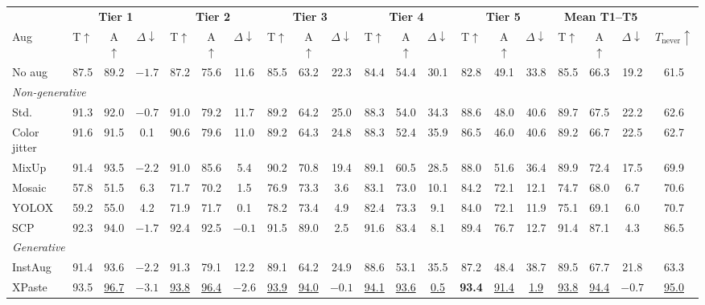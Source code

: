 \begin{tabular}{l ccc ccc ccc ccc ccc ccc c}
\toprule
& \multicolumn{3}{c}{\textbf{Tier 1}} & \multicolumn{3}{c}{\textbf{Tier 2}} & \multicolumn{3}{c}{\textbf{Tier 3}} & \multicolumn{3}{c}{\textbf{Tier 4}} & \multicolumn{3}{c}{\textbf{Tier 5}} & \multicolumn{3}{c}{\textbf{Mean T1--T5}} & \\
\cmidrule(lr){2-4} \cmidrule(lr){5-7} \cmidrule(lr){8-10} \cmidrule(lr){11-13} \cmidrule(lr){14-16} \cmidrule(lr){17-19}
Aug & T$\uparrow$ & A$\uparrow$ & $\Delta\downarrow$ & T$\uparrow$ & A$\uparrow$ & $\Delta\downarrow$ & T$\uparrow$ & A$\uparrow$ & $\Delta\downarrow$ & T$\uparrow$ & A$\uparrow$ & $\Delta\downarrow$ & T$\uparrow$ & A$\uparrow$ & $\Delta\downarrow$ & T$\uparrow$ & A$\uparrow$ & $\Delta\downarrow$ & $T_{\text{never}}\uparrow$ \\
\midrule
No aug & 87.5 & 89.2 & $-1.7$ & 87.2 & 75.6 & 11.6 & 85.5 & 63.2 & 22.3 & 84.4 & 54.4 & 30.1 & 82.8 & 49.1 & 33.8 & 85.5 & 66.3 & 19.2 & 61.5 \\
\midrule
\multicolumn{20}{l}{\emph{Non-generative}} \\
Std. & 91.3 & 92.0 & $-0.7$ & 91.0 & 79.2 & 11.7 & 89.2 & 64.2 & 25.0 & 88.3 & 54.0 & 34.3 & 88.6 & 48.0 & 40.6 & 89.7 & 67.5 & 22.2 & 62.6 \\
Color jitter & 91.6 & 91.5 & 0.1 & 90.6 & 79.6 & 11.0 & 89.2 & 64.3 & 24.8 & 88.3 & 52.4 & 35.9 & 86.5 & 46.0 & 40.6 & 89.2 & 66.7 & 22.5 & 62.7 \\
MixUp & 91.4 & 93.5 & $-2.2$ & 91.0 & 85.6 & 5.4 & 90.2 & 70.8 & 19.4 & 89.1 & 60.5 & 28.5 & 88.0 & 51.6 & 36.4 & 89.9 & 72.4 & 17.5 & 69.9 \\
Mosaic & 57.8 & 51.5 & 6.3 & 71.7 & 70.2 & 1.5 & 76.9 & 73.3 & 3.6 & 83.1 & 73.0 & 10.1 & 84.2 & 72.1 & 12.1 & 74.7 & 68.0 & 6.7 & 70.6 \\
YOLOX & 59.2 & 55.0 & 4.2 & 71.9 & 71.7 & 0.1 & 78.2 & 73.4 & 4.9 & 82.4 & 73.3 & 9.1 & 84.0 & 72.1 & 11.9 & 75.1 & 69.1 & 6.0 & 70.7 \\
SCP & 92.3 & 94.0 & $-1.7$ & 92.4 & 92.5 & $-0.1$ & 91.5 & 89.0 & 2.5 & 91.6 & 83.4 & 8.1 & 89.4 & 76.7 & 12.7 & 91.4 & 87.1 & 4.3 & 86.5 \\
\midrule
\multicolumn{20}{l}{\emph{Generative}} \\
InstAug & 91.4 & 93.6 & $-2.2$ & 91.3 & 79.1 & 12.2 & 89.1 & 64.2 & 24.9 & 88.6 & 53.1 & 35.5 & 87.2 & 48.4 & 38.7 & 89.5 & 67.7 & 21.8 & 63.3 \\
XPaste & 93.5 & \underline{96.7} & \textbf{\boldmath $-3.1$} & \underline{93.8} & \underline{96.4} & \textbf{\boldmath $-2.6$} & \underline{93.9} & \underline{94.0} & \underline{$-0.1$} & \underline{94.1} & \underline{93.6} & \underline{0.5} & \textbf{93.4} & \underline{91.4} & \underline{1.9} & \underline{93.8} & \underline{94.4} & \underline{$-0.7$} & \underline{95.0} \\

\end{tabular}
